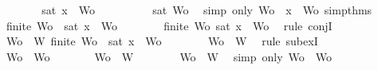 \begin{isabellebody}
\ \ \ \ \isamarkupfalse%
\ \isamarkupfalse%
\ {\isachardoublequoteopen}{\isasymnot}{\isacharparenleft}sat\ {\isacharparenleft}{\isacharbraceleft}x{\isacharbraceright}\ {\isasymunion}\ Wo{\isacharparenright}{\isacharparenright}{\isachardoublequoteclose}\ \isanewline
\ \ \ \ \ \ \isamarkupfalse%
\ {\isacartoucheopen}{\isasymnot}\ sat\ Wo{\isacharprime}{\isacartoucheclose}\ \isamarkupfalse%
\ {\isacharparenleft}simp\ only{\isacharcolon}\ {\isacartoucheopen}Wo{\isacharprime}\ {\isacharequal}\ {\isacharbraceleft}x{\isacharbraceright}\ {\isasymunion}\ Wo{\isacartoucheclose}\ simp{\isacharunderscore}thms{\isacharparenleft}{}{\isacharparenright}{\isacharparenright}\isanewline
\ \ \ \ \isamarkupfalse%
\ {\isachardoublequoteopen}finite\ Wo\ {\isasymand}\ {\isasymnot}{\isacharparenleft}sat\ {\isacharparenleft}{\isacharbraceleft}x{\isacharbraceright}\ {\isasymunion}\ Wo{\isacharparenright}{\isacharparenright}{\isachardoublequoteclose}\isanewline
\ \ \ \ \ \ \isamarkupfalse%
\ {\isacartoucheopen}finite\ Wo{\isacartoucheclose}\ {\isacartoucheopen}{\isasymnot}{\isacharparenleft}sat\ {\isacharparenleft}{\isacharbraceleft}x{\isacharbraceright}\ {\isasymunion}\ Wo{\isacharparenright}{\isacharparenright}{\isacartoucheclose}\ \isamarkupfalse%
\ {\isacharparenleft}rule\ conjI{\isacharparenright}\isanewline
\ \ \ \ \isamarkupfalse%
\ {\isachardoublequoteopen}{\isasymexists}Wo\ {\isasymsubseteq}\ W{\isachardot}\ finite\ Wo\ {\isasymand}\ {\isasymnot}{\isacharparenleft}sat\ {\isacharparenleft}{\isacharbraceleft}x{\isacharbraceright}\ {\isasymunion}\ Wo{\isacharparenright}{\isacharparenright}{\isachardoublequoteclose}\isanewline
\ \ \ \ \ \ \isamarkupfalse%
\ {\isacartoucheopen}Wo\ {\isasymsubseteq}\ W{\isacartoucheclose}\ \isamarkupfalse%
\ {\isacharparenleft}rule\ subexI{\isacharparenright}\isanewline
\ \ \isamarkupfalse%
\isanewline
\ \ \ \ \isamarkupfalse%
\ {\isachardoublequoteopen}Wo{\isacharprime}\ {\isacharequal}\ Wo{\isachardoublequoteclose}\isanewline
\ \ \ \ \isamarkupfalse%
\ \isamarkupfalse%
\ {\isachardoublequoteopen}Wo{\isacharprime}\ {\isasymsubseteq}\ W{\isachardoublequoteclose}\isanewline
\ \ \ \ \ \ \isamarkupfalse%
\ {\isacartoucheopen}Wo\ {\isasymsubseteq}\ W{\isacartoucheclose}\ \isamarkupfalse%
\ {\isacharparenleft}simp\ only{\isacharcolon}\ {\isacartoucheopen}Wo{\isacharprime}\ {\isacharequal}\ Wo{\isacartoucheclose}{\isacharparenright}\isanewline

\end{isabellebody}
